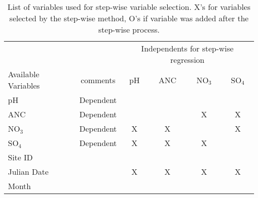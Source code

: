 \begin{table}[htbp]
\caption{List of variables used for step-wise variable selection.  X's for variables selected by the step-wise method, O's if variable was added after the step-wise process.}
\begin{tabular}{lccccc}
\toprule
                                      &                    & \multicolumn{ 4}{c}{Independents for step-wise regression}                                                                                                                                               \\ \cline{3-6}\noalign{\smallskip}
Available Variables         & comments  & \multicolumn{1}{p{1.2cm}}{pH} &\multicolumn{1}{p{1.2cm}}{ANC} & \multicolumn{1}{p{1.2cm}}{NO$_3$} & \multicolumn{1}{p{1.2cm}}{SO$_4$} \\ 
\midrule
pH                                  & Dependent &                                                     &                                                      &                                                              &  \\ 
ANC                               &Dependent  &                                                     &                                                      & X                                                           & X \\ 
NO$_3$                         &Dependent  & X                                                  & X                                                   &                                                              & X \\ 
SO$_4$                         &Dependent  &X                                                   & X                                                   & X                                                            &  \\ 
Site ID                           &                   &                                                      &                                                      &                                                             &  \\ 
Julian Date                    &                   &X                                                    &X                                                    &X                                                             & X \\ 
Month                            &                   &                                                      &                                                     &                                                                &  \\ 

\end{tabular}
\end{table}

